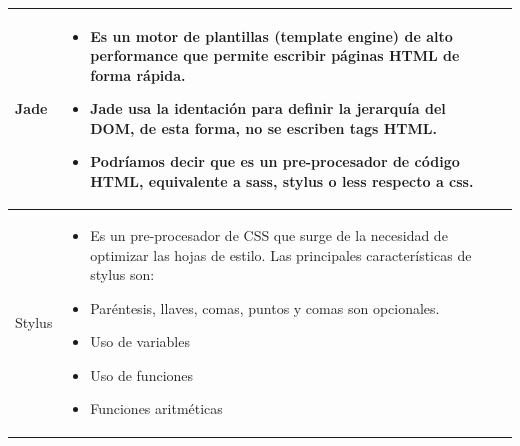 \newpage
\begin{table}[b!]
	\centering
	\begin{tabular}{|p{2cm}|ll}
		\hline
		\multicolumn{1}{|p{5cm}|}{Jade}   &   
		\multicolumn{1}{p{10cm}|}{
		\begin{itemize}
		\vspace{5mm}
		\item Es un motor de plantillas (template engine) de alto performance
		que permite escribir páginas HTML de forma rápida.
		\item Jade usa la identación para definir la jerarquía del DOM, de esta
		forma, no se escriben tags HTML.
		\item Podríamos decir que es un pre-procesador de código HTML, equivalente a sass, stylus o less respecto a css.
		\end{itemize}} \\
		\hline
		\multicolumn{1}{|p{5cm}|}{Stylus} &   
		\multicolumn{1}{p{10cm}|}{
		\begin{itemize}
		\vspace{10mm}
		\item Es un pre-procesador de CSS que surge de la necesidad de optimizar
		las hojas de estilo.
		Las principales características de stylus son:              
		\item Paréntesis, llaves, comas, puntos y comas son opcionales.
		\item Uso de variables
		\item Uso de funciones
		\item Funciones aritméticas
		\end{itemize}} \\
		\hline
	\end{tabular}
\end{table}

